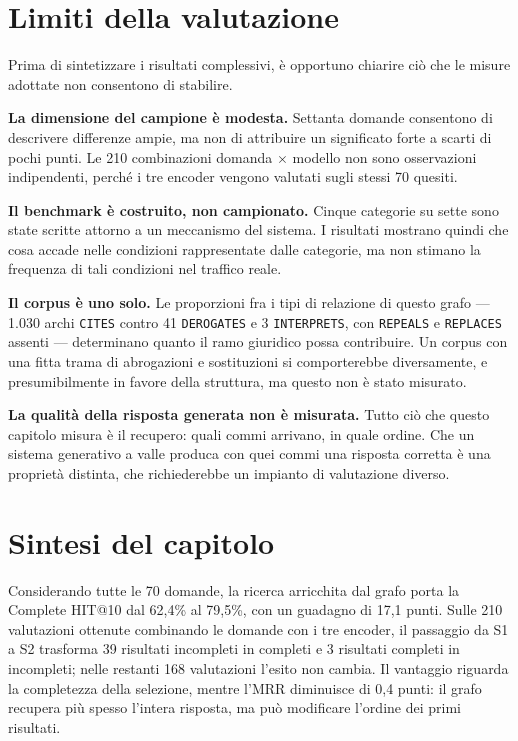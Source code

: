 \section{Limiti della valutazione}

Prima di sintetizzare i risultati complessivi, è opportuno chiarire ciò che le misure adottate non consentono di stabilire.

\textbf{La dimensione del campione è modesta.} Settanta domande consentono di descrivere differenze ampie, ma non di attribuire un significato forte a scarti di pochi punti. Le 210 combinazioni domanda $\times$ modello non sono osservazioni indipendenti, perché i tre encoder vengono valutati sugli stessi 70 quesiti.

\textbf{Il benchmark è costruito, non campionato.} Cinque categorie su sette sono state scritte attorno a un meccanismo del sistema. I risultati mostrano quindi che cosa accade nelle condizioni rappresentate dalle categorie, ma non stimano la frequenza di tali condizioni nel traffico reale.

\textbf{Il corpus è uno solo.} Le proporzioni fra i tipi di relazione di questo grafo --- 1.030 archi \texttt{CITES} contro 41 \texttt{DEROGATES} e 3 \texttt{INTERPRETS}, con \texttt{REPEALS} e \texttt{REPLACES} assenti --- determinano quanto il ramo giuridico possa contribuire. Un corpus con una fitta trama di abrogazioni e sostituzioni si comporterebbe diversamente, e presumibilmente in favore della struttura, ma questo non è stato misurato.

\textbf{La qualità della risposta generata non è misurata.} Tutto ciò che questo capitolo misura è il recupero: quali commi arrivano, in quale ordine. Che un sistema generativo a valle produca con quei commi una risposta corretta è una proprietà distinta, che richiederebbe un impianto di valutazione diverso.

\section{Sintesi del capitolo}

Considerando tutte le 70 domande, la ricerca arricchita dal grafo porta la Complete HIT@10 dal 62,4\% al 79,5\%, con un guadagno di 17,1 punti. Sulle 210 valutazioni ottenute combinando le domande con i tre encoder, il passaggio da S1 a S2 trasforma 39 risultati incompleti in completi e 3 risultati completi in incompleti; nelle restanti 168 valutazioni l'esito non cambia. Il vantaggio riguarda la completezza della selezione, mentre l'MRR diminuisce di 0,4 punti: il grafo recupera più spesso l'intera risposta, ma può modificare l'ordine dei primi risultati.

